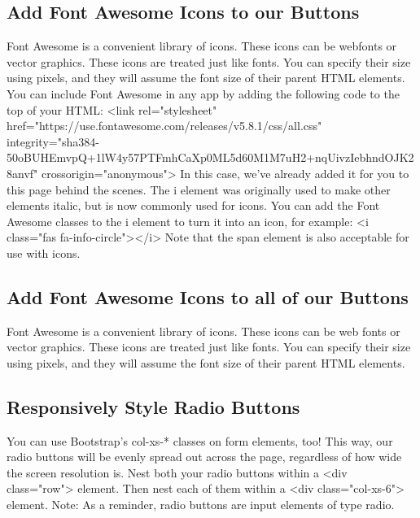 \documentclass{article}%
\begin{document}
\subsection{Add Font Awesome Icons to our Buttons}%
\label{subsec:AddFontAwesomeIconstoourButtons}%
Font Awesome is a convenient library of icons. These icons can be webfonts or vector graphics. These icons are treated just like fonts. You can specify their size using pixels, and they will assume the font size of their parent HTML elements.\newline%
You can include Font Awesome in any app by adding the following code to the top of your HTML:\newline%
<link rel="stylesheet" href="https://use.fontawesome.com/releases/v5.8.1/css/all.css" integrity="sha384{-}50oBUHEmvpQ+1lW4y57PTFmhCaXp0ML5d60M1M7uH2+nqUivzIebhndOJK28anvf" crossorigin="anonymous">\newline%
In this case, we've already added it for you to this page behind the scenes.\newline%
The i element was originally used to make other elements italic, but is now commonly used for icons. You can add the Font Awesome classes to the i element to turn it into an icon, for example:\newline%
<i class="fas fa{-}info{-}circle"></i>\newline%
Note that the span element is also acceptable for use with icons.\newline%

%
\subsection{Add Font Awesome Icons to all of our Buttons}%
\label{subsec:AddFontAwesomeIconstoallofourButtons}%
Font Awesome is a convenient library of icons. These icons can be web fonts or vector graphics. These icons are treated just like fonts. You can specify their size using pixels, and they will assume the font size of their parent HTML elements.\newline%

%
\subsection{Responsively Style Radio Buttons}%
\label{subsec:ResponsivelyStyleRadioButtons}%
You can use Bootstrap's col{-}xs{-}* classes on form elements, too! This way, our radio buttons will be evenly spread out across the page, regardless of how wide the screen resolution is.\newline%
Nest both your radio buttons within a <div class="row"> element. Then nest each of them within a <div class="col{-}xs{-}6"> element.\newline%
Note: As a reminder, radio buttons are input elements of type radio.\newline%
\end{document}
